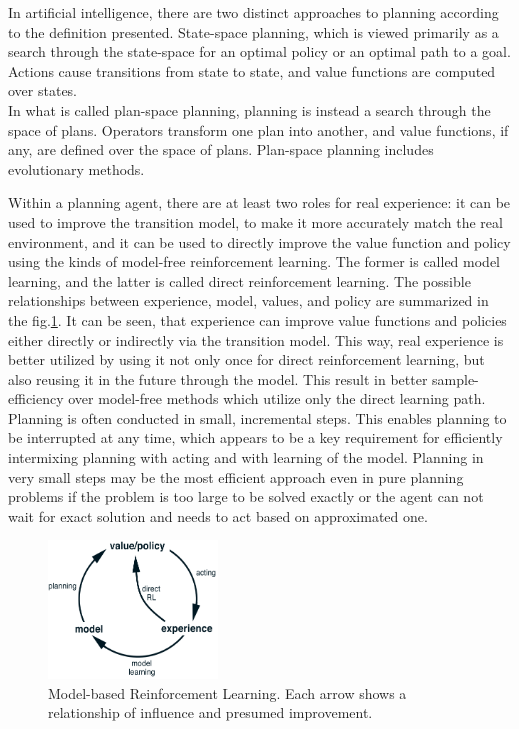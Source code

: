 In artificial intelligence, there are two distinct approaches to planning according to the definition presented. State-space planning, which is viewed primarily as a search through the state-space for an optimal policy or an optimal path to a goal. Actions cause transitions from state to state, and value functions are computed over states. \\
In what is called plan-space planning, planning is instead a search through the space of plans. Operators transform one plan into another, and value functions, if any, are defined over the space of plans. Plan-space planning includes evolutionary methods.

Within a planning agent, there are at least two roles for real experience: it can be used to improve the transition model, to make it more accurately match the real environment, and it can be used to directly improve the value function and policy using the kinds of model-free reinforcement learning. The former is called model learning, and the latter is called direct reinforcement learning. The possible relationships between experience, model, values, and policy are summarized in the fig.\ref{Fig.ModelBasedRL}. It can be seen, that experience can improve value functions and policies either directly or indirectly via the transition model. This way, real experience is better utilized by using it not only once for direct reinforcement learning, but also reusing it in the future through the model. This result in better sample-efficiency over model-free methods which utilize only the direct learning path. \\
Planning is often conducted in small, incremental steps. This enables planning to be interrupted at any time, which appears to be a key requirement for efficiently intermixing planning with acting and with learning of the model. Planning in very small steps may be the most efficient approach even in pure planning problems if the problem is too large to be solved exactly or the agent can not wait for exact solution and needs to act based on approximated one.

\begin{figure}[H]
\includegraphics[width=0.4\textwidth,keepaspectratio]{figures/ModelBasedRL.png}
\caption{Model-based Reinforcement Learning. \protect\cite{Book.RLAI} Each arrow shows a relationship of influence and presumed improvement.}
\label{Fig.ModelBasedRL}
\end{figure}

